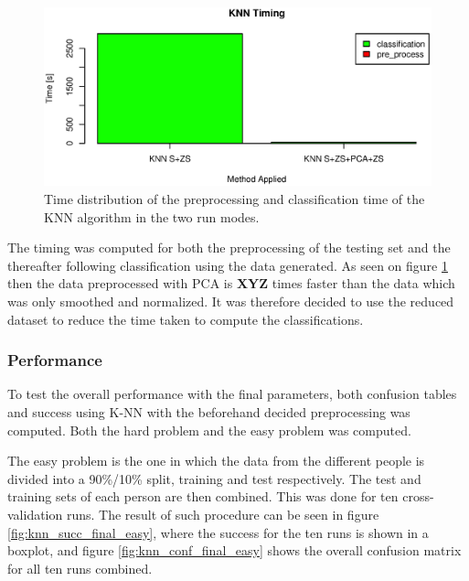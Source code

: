 \begin{figure}[H]
\centering
\includegraphics[width =  \textwidth]{graphics/compare_timing_knn_smoothVSpca}
\caption{Time distribution of the preprocessing and classification time of the KNN algorithm in the two run modes.}
\label{fig:knn_timing_comp}
\end{figure}

The timing was computed for both the preprocessing of the testing set and the thereafter following classification using the data generated.
As seen on figure \ref{fig:knn_timing_comp} then the data preprocessed with PCA is \textbf{XYZ} times faster than the data which was only smoothed and normalized.
It was therefore decided to use the reduced dataset to reduce the time taken to compute the classifications.


\subsubsection{Performance}

To test the overall performance with the final parameters, both confusion tables and success using K-NN with the beforehand decided preprocessing was computed.
Both the hard problem and the easy problem was computed.

The easy problem is the one in which the data from the different people is divided into a 90\%/10\% split, training and test respectively.
The test and training sets of each person are then combined.
This was done for ten cross-validation runs.
The result of such procedure can be seen in figure \ref{fig:knn_succ_final_easy}, where the success for the ten runs is shown in a boxplot, and figure \ref{fig:knn_conf_final_easy} shows the overall confusion matrix for all ten runs combined.


